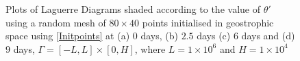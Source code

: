 \begin{figure}[ht!]
	\centering
	\\
	\\
	\caption{Plots of Laguerre Diagrams shaded according to the value of $\theta '$ using a random mesh of $80 \times 40$ points initialised in geostrophic space using \ref{Initpoints} at (a) $0$ days, (b) $2.5$ days (c) $6$ days and (d) $9$ days, $\Gamma = [-L,L]\times[0,H]$, where $L = 1\times10^6$ and $H = 1\times10^4$}
	\label{fig: thetap ldiag}
\end{figure}

